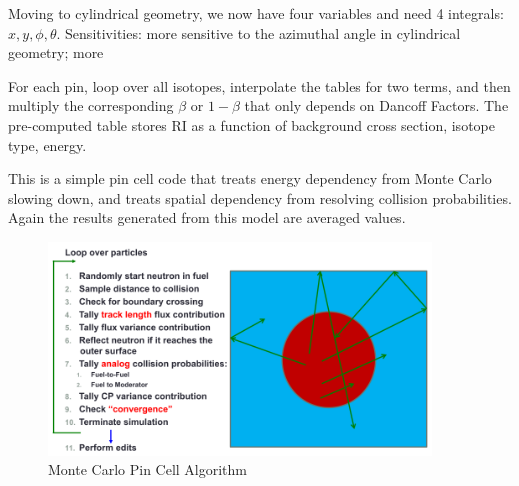 \documentclass{school-22.211-notes}
\begin{document}
\clearpage
{}
Moving to cylindrical geometry, we now have four variables and need 4 integrals: $x,y, \phi, \theta$. Sensitivities: more sensitive to the azimuthal angle in cylindrical geometry; more 


For each pin, loop over all isotopes, interpolate the tables for two terms, and then multiply the corresponding $\beta$ or $1-\beta$ that only depends on Dancoff Factors. The pre-computed table stores RI as a function of background cross section, isotope type, energy. 



\clearpage
{}

This is a simple pin cell code that treats energy dependency from Monte Carlo slowing down, and treats spatial dependency from resolving collision probabilities. Again the results generated from this model are averaged values. 

\begin{figure}[h]
  \centering
  \includegraphics[width=4in]{images/pin/MC-pincell.png}
  \caption{Monte Carlo Pin Cell Algorithm}
\end{figure}
\end{document}
